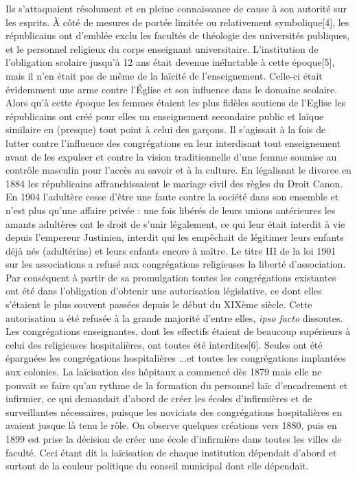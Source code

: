  Ils s'attaquaient résolument et en pleine connaissance de cause à son autorité sur les esprits.
 À côté de mesures de portée limitée ou relativement symbolique[4], les républicains ont d'emblée exclu les facultés de théologie des universités publiques, et le personnel religieux du corps enseignant universitaire. L'institution de l'obligation scolaire jusqu'à 12 ans était devenue inéluctable à cette époque[5], mais il n'en était pas de même de la laïcité de l'enseignement. Celle-ci était évidemment une arme contre l'Église et son influence dans le domaine scolaire. Alors qu'à cette époque les femmes étaient les plus fidèles soutiens de l'Eglise les républicains ont créé pour elles un enseignement secondaire public et laïque similaire en (presque) tout point à celui des garçons. Il s'agissait à la fois de lutter contre l'influence des congrégations en leur interdisant tout enseignement avant de les expulser et contre la vision traditionnelle d'une femme soumise au contrôle masculin pour l'accès au savoir et à la culture. 
 En légalisant le divorce en 1884 les républicains affranchissaient le mariage civil des règles du Droit Canon. En 1904 l'adultère cesse d'être une faute contre la société dans son ensemble et n'est plus qu'une affaire privée : une fois libérés de leurs unions antérieures les amants adultères ont le droit de s'unir légalement, ce qui leur était interdit à vie depuis l'empereur Justinien, interdit qui les empêchait de légitimer leurs enfants déjà nés (adultérins) et leurs enfants encore à naître. 
 Le titre III de la loi 1901 sur les associations a refusé aux congrégations religieuses la liberté d'association. Par conséquent à partir de sa promulgation toutes les congrégations existantes ont été dans l'obligation d'obtenir une autorisation législative, ce dont elles s'étaient le plus souvent passées depuis le début du XIXème siècle. Cette autorisation a été refusée à la grande majorité d'entre elles, \emph{ipso facto} dissoutes. Les congrégations enseignantes, dont les effectifs étaient de beaucoup supérieurs à celui des religieuses hospitalières, ont toutes été interdites[6]. Seules ont été épargnées les congrégations hospitalières ...et toutes les congrégations implantées aux colonies. 
 La laïcisation des hôpitaux a commencé dès 1879 mais elle ne pouvait se faire qu'au rythme de la formation du personnel laïc d'encadrement et infirmier, ce qui demandait d'abord de créer les écoles d'infirmières et de surveillantes nécessaires, puisque les noviciats des congrégations hospitalières en avaient jusque là tenu le rôle. On observe quelques créations vers 1880, puis en 1899 est prise la décision de créer une école d'infirmière dans toutes les villes de faculté. Ceci étant dit la laïcisation de chaque institution dépendait d'abord et surtout de la couleur politique du conseil municipal dont elle dépendait.

